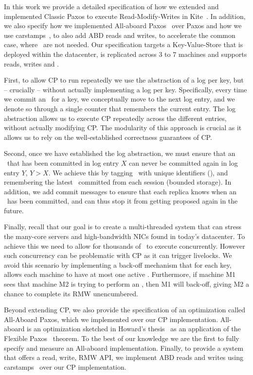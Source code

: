 \custvspace
In this work we provide a detailed specification of how we extended and implemented Classic Paxos to execute Read-Modify-Writes in Kite~\cite{V:2020}. In addition, we also specify how we implemented All-aboard Paxos~\cite{Howard:2019} over Paxos and how we use carstamps~\cite{Burke:2020}, to also add ABD reads and writes, to accelerate the common case, where \RMWs\ are not needed.
Our specification targets a Key-Value-Store that is deployed within the datacenter, is replicated across 3 to 7 machines and supports reads, writes and \RMWs.


First, to allow CP to run repeatedly we use the abstraction of a log per key, but -- crucially -- without actually implementing a log per key. Specifically, every time we commit an \RMW\ for a key, we conceptually move to the next log entry, and we denote so through a single counter that remembers the current entry. The log abstraction allows us to execute CP repeatedly across the different entries, without actually modifying CP. The modularity of this approach is crucial as it allows us to rely on the well-established correctness guarantees of CP.

Second, once we have established the log abstraction, we must ensure that an \RMW\ that has been committed in log entry $X$ can never be committed again in log entry $Y$, $Y > X$. We achieve this by tagging \RMWs\ with unique identifiers (\rmws), and remembering the latest \rmw\ committed from each session (bounded storage). In addition, we add commit messages to ensure that each replica knows when an \RMW\ has been committed, and can thus stop it from getting proposed again in the future.

Finally, recall that our goal is to create a multi-threaded system that can stress the  many-core servers and high-bandwidth NICs found in today's datacenter. To achieve this we need to allow for thousands of \RMWs\ to execute concurrently. However such concurrency can be problematic with CP as it can trigger livelocks. We avoid this scenario by implementing a back-off mechanism that for each key, allows each machine to have at most one active \RMW. Furthermore, if machine M1 sees that machine M2 is trying to perform an \RMW, then M1 will back-off, giving M2 a chance to complete its RMW unencumbered.

\custvspace
Beyond extending CP, we also provide the specification of an optimization called All-Aboard Paxos, which we implemented over our CP implementation. All-aboard is an optimization sketched in Howard's thesis~\cite{Howard:2019} as an application of the Flexible Paxos~\cite{Howard:2016} theorem. To the best of our knowledge we are the first to fully specify and measure an All-aboard implementation.
Finally, to provide a system that offers a read, write, RMW API, we implement ABD reads and writes using carstamps~\cite{Burke:2020} over our CP implementation.

